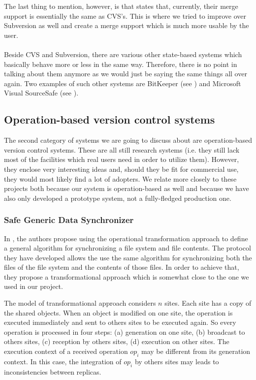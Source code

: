 The last thing to mention, however, is that \cite{subv} states that, currently, their merge support
is essentially the same as CVS's. This is where we tried to improve over Subversion as well and
create a merge support which is much more usable by the user.\\
\\
Beside CVS and Subversion, there are various other state-based systems which basically behave
more or less in the same way. Therefore, there is no point in talking about them anymore as we
would just be saying the same things all over again. Two examples of such other systems are
BitKeeper (see \cite{bitk}) and Microsoft Visual SourceSafe (see \cite{vss}).


\subsection{Operation-based version control systems}

The second category of systems we are going to discuss about are operation-based version control
systems. These are all still research systems (i.e. they still lack most of the facilities which
real users need in order to utilize them). However, they enclose very interesting ideas and, should
they be fit for commercial use, they would most likely find a lot of adopters. We relate more
closely to these projects both because our system is operation-based as well and because we have
also only developed a prototype system, not a fully-fledged production one.

\subsubsection{Safe Generic Data Synchronizer}

In \cite{molli03}, the authors propose using the operational transformation approach to define
a general algorithm for synchronizing a file system and file contents. The protocol they have
developed allows the use the same algorithm for synchronizing both the files of the file system
and the contents of those files. In order to achieve that, they propose a transformational approach
which is somewhat close to the one we used in our project.

The model of transformational approach considers $n$ sites. Each site has a copy of the shared
objects. When an object is modified on one site, the operation is executed immediately and sent
to others sites to be executed again. So every operation is processed in four steps: (a) generation
on one site, (b) broadcast to others sites, (c) reception by others sites, (d) execution on other
sites. The execution context of a received operation $op_i$ may be different from its generation
context. In this case, the integration of $op_i$ by others sites may leads to inconsistencies
between replicas. 

